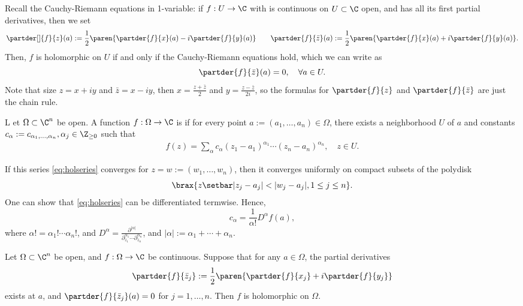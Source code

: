 \documentclass[11pt]{report}
\begin{document}
Recall the Cauchy-Riemann equations in 1-variable: if $f:U \to \C$ with is continuous on $U \subset \C$ open, and has all its first partial derivatives, then we set
$$\partder[]{f}{z}(a):=\frac{1}{2}\paren{\partder{f}{x}(a)-i\partder{f}{y}(a)} \quad \quad \partder{f}{\bar z}(a):= \frac{1}{2}\paren{\partder{f}{x}(a) +i\partder{f}{y}(a)}.$$
Then, $f$ is holomorphic on $U$ if and only if the Cauchy-Riemann equations hold, which we can write as
$$\partder{f}{\bar z}(a)=0, \quad \forall a \in U.$$
Note that size $z=x+iy$ and $\bar z=x-iy$, then $x=\frac{z+\bar z}{2}$ and $y=\frac{z-\bar z}{2i}$, so the formulas for $\partder{f}{z}$ and $\partder{f}{\bar z}$ are just the chain rule.


\begin{defn}
    L et $\Omega \subset \C^n$ be open. A function $f:\Omega \to \C$ is  if for every point $a:=(a_1,\dots,a_n) \in \Omega$, there exists a neighborhood $U$ of $a$ and constants $c_\alpha:=c_{\alpha_1,\dots,\alpha_n}, \alpha_j \in \Z_{\geq 0}$ such that
    \begin{align} \label{eq:holseries}
        f(z) = \sum_{\alpha}c_\alpha(z_1-a_1)^{\alpha_1}\cdots (z_n-a_n)^{\alpha_n}, \quad z \in U.
    \end{align}
\end{defn}

If this series \eqref{eq:holseries} converges for $z=w:=(w_1,\dots,w_n)$, then it converges uniformly on compact subsets of the polydisk
    $$\brax{z \setbar |z_j-a_j|<|w_j-a_j|,1\leq j \leq n}.$$
One can show that \eqref{eq:holseries} can be differentiated termwise. Hence,
$$c_\alpha = \frac{1}{\alpha!}D^\alpha f(a),$$
where $\alpha! = \alpha_1!\cdots \alpha_n!$, and $D^\alpha =\frac{\partial^{|\alpha |}}{\partial_{z_1}^{\alpha_1}\cdots \partial_{z_n}^{\alpha_n}}$, and $|\alpha|:=\alpha_1+\cdots +\alpha _n$.

\begin{thm}
    Let $\Omega \subset \C^n$ be open, and $f:\Omega \to \C$ be continuous. Suppose that for any $a \in \Omega$, the partial derivatives
    $$\partder{f}{\bar z_j}:=\frac{1}{2}\paren{\partder{f}{x_j}+i\partder{f}{y_j}}$$
    exists at $a$, and $\partder{f}{\bar z_j}(a)=0$ for $j=1,\dots,n$. Then $f$ is holomorphic on $\Omega$.
\end{thm}
\end{document}

